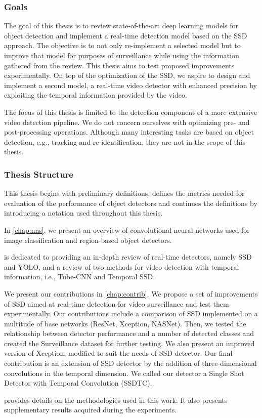 \subsubsection{Goals}
The goal of this thesis is to review state-of-the-art deep learning models for object detection and implement a real-time detection model based on the SSD approach. The objective is to not only re-implement a selected model but to improve that model for purposes of surveillance while using the information gathered from the review. This thesis aims to test proposed improvements experimentally. On top of the optimization of the SSD, we aspire to design and implement a second model, a real-time video detector with enhanced precision by exploiting the temporal information provided by the video.

The focus of this thesis is limited to the detection component of a more extensive video detection pipeline. We do not concern ourselves with optimizing pre- and post-processing operations. Although many interesting tasks are based on object detection, e.g., tracking and re-identification, they are not in the scope of this thesis.

\subsubsection{Thesis Structure}
This thesis begins with preliminary definitions.  defines the metrics needed for evaluation of the performance of object detectors and continues the definitions by introducing a notation used throughout this thesis. 

In \cref{chap:nns}, we present an overview of convolutional neural networks used for image classification and region-based object detectors. 

 is dedicated to providing an in-depth review of real-time detectors, namely SSD and YOLO, and a review of two methods for video detection with temporal information, i.e., Tube-CNN and Temporal SSD. 

We present our contributions in \cref{chap:contrib}. We propose a set of improvements of SSD aimed at real-time detection for video surveillance and test them experimentally. Our contributions include a comparison of SSD implemented on a multitude of base networks (ResNet, Xception, NASNet). Then, we tested the relationship between detector performance and a number of detected classes and created the Surveillance dataset for further testing. We also present an improved version of Xception, modified to suit the needs of SSD detector. Our final contribution is an extension of SSD detector by the addition of three-dimensional convolutions in the temporal dimension. We called our detector a Single Shot Detector with Temporal Convolution (SSDTC).

 provides details on the methodologies used in this work. It also presents supplementary results acquired during the experiments.